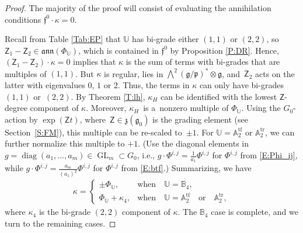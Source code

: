 \documentclass[pdftex]{sigma}%
\newcommand\tensor{\otimes}
\DeclareMathOperator{\tf}{tf}
\DeclareMathOperator{\tr}{tr}
\DeclareMathOperator{\diag}{diag}
\newcommand\GL{\operatorname{GL}}
\newcommand{\g}{\mathfrak{g}}
\newcommand\fann{\mathfrak{ann}}
\newcommand\ff{\mathfrak{f}}
\newcommand\fp{\mathfrak{p}}
\newcommand\fz {\mathfrak{z}}
\newcommand\bbU{\mathbb{U}}
\newcommand\bbA{\mathbb{A}}
\newcommand\bbB{\mathbb{B}}
\newcommand\sfZ{\mathsf{Z}}
\numberwithin{equation}{section}
\begin{document}
\begin{proof}
The majority of the proof will consist of evaluating the annihilation conditions $\ff^0 \cdot \kappa = 0$.

Recall from Table \ref{Tab:EP} that $\bbU$ has bi-grade either $(1,1)$ or $(2,2)$, so $\sfZ_1 - \sfZ_2 \in \fann(\Phi_\bbU)$, which is contained in $\ff^0$ by Proposition \ref{P:DR}. Hence, $(\sfZ_1 - \sfZ_2) \cdot \kappa = 0$ implies that $\kappa$ is the sum of terms with bi-grades that are multiples of $(1,1)$. But $\kappa$ is regular, lies in $\bigwedge^2(\g/\fp)^\ast \tensor \g$, and~$\sfZ_2$ acts on the latter with eigenvalues $0$, $1$ or $2$. Thus, the terms in $\kappa$ can only have bi-grades~$(1,1)$ or~$(2,2)$.
By Theorem \ref{T:lh}, $\kappa_H$ can be identified with the lowest $\sfZ$-degree component of $\kappa$. Moreover, $\kappa_H$~is a~nonzero multiple of $\Phi_\bbU$. Using the $G_0$-action by $\exp(\sfZ t)$, where~$\sfZ \in \fz(\g_0)$ is the grading element (see Section~\ref{S:FM}), this multiple can be re-scaled to~$\pm 1$. For $\bbU = \bbA_2^{\tf}$ or $\bbA_2^{\tr}$, we can further normalize this multiple to $+1$. (Use the diagonal elements in~${g = \diag(a_1,\dots ,a_m) \in \GL_m \subset G_0}$, i.e., $g \cdot \Phi^{i,j} = \frac{1}{a_1} \Phi^{i,j}$ for $\Phi^{i,j}$ from \eqref{E:Phi_ij}, while
${g \cdot \Phi^{i,j} = \frac{a_m}{(a_1)^2} \Phi^{i,j}}$ for $\Phi^{i,j}$ from \eqref{E:btf}.)
Summarizing, we have
\begin{align*}%
\kappa =
\begin{cases}
\pm \Phi_\bbU, & \text{when} \quad \bbU = \bbB_4,\\
\Phi_\bbU + \kappa_4, & \text{when} \quad \bbU = \bbA_2^{\tf} \quad \text{or}\quad \bbA_2^{\tr},
\end{cases}
\end{align*}
where $\kappa_4$ is the bi-grade $(2,2)$ component of $\kappa$. The $\bbB_4$ case is complete, and we turn to the remaining cases.
	

\end{proof}
\end{document}
